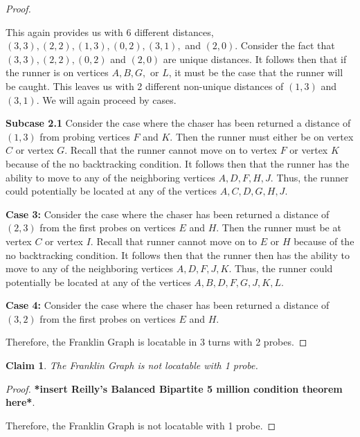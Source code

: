 \documentclass[11pt]{article}
\newtheorem{clm}{Claim}
\begin{document}
\begin{proof}
\begin{center}
		\end{center}
		This again provides us with 6 different distances, $(3,3),(2,2),(1,3),(0,2),(3,1),$ and $(2,0)$. Consider the fact that $(3,3),(2,2),(0,2)$ and $(2,0)$ are unique distances. It follows then that if the runner is on vertices $A,B,G,$ or $L$, it must be the case that the runner will be caught. This leaves us with 2 different non-unique distances of $(1,3)$ and $(3,1)$. We will again proceed by cases.
		
		\textbf{Subcase 2.1} Consider the case where the chaser has been returned a distance of $(1,3)$ from probing vertices $F$ and $K$. Then the runner must either be on vertex $C$ or vertex $G$. Recall that the runner cannot move on to vertex $F$ or vertex $K$ because of the no backtracking condition. It follows then that the runner has the ability to move to any of the neighboring vertices $A,D,F,H,J$. Thus, the runner could potentially be located at any of the vertices $A,C,D,G,H,J$.
		
		\textbf{Case 3:} Consider the case where the chaser has been returned a distance of $(2,3)$ from the first probes on vertices $E$ and $H$. Then the runner must be at vertex $C$ or vertex $I$. Recall that runner cannot move on to $E$ or $H$ because of the no backtracking condition. It follows then that the runner then has the ability to move to any of the neighboring vertices $A,D,F,J,K$. Thus, the runner could potentially be located at any of the vertices $A,B,D,F,G,J,K,L$.
		
		\textbf{Case 4:} Consider the case where the chaser has been returned a distance of $(3,2)$ from the first probes on vertices $E$ and $H$.
		
		Therefore, the Franklin Graph is locatable in 3 turns with 2 probes.
	\end{proof}
	\begin{clm}
		The Franklin Graph is not locatable with 1 probe.
	\end{clm}
	\begin{proof}
		\textbf{*insert Reilly's Balanced Bipartite 5 million condition theorem here*}.
		
		Therefore, the Franklin Graph is not locatable with 1 probe.
	\end{proof}
\end{document}
